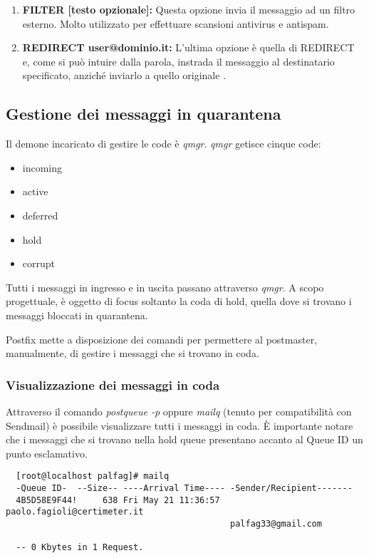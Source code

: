 \begin{table}[htp]
\begin{enumerate}[label=\textbf{\arabic*})]
      \item{\textbf{FILTER [testo opzionale]:}}
      Questa opzione invia il messaggio ad un filtro esterno. Molto utilizzato per effettuare scansioni 
      antivirus e antispam.
      
      \item{\textbf{REDIRECT user@dominio.it:}} 
      L'ultima opzione è quella di REDIRECT e, come si può intuire dalla parola, instrada il messaggio al 
      destinatario specificato, anziché inviarlo a quello originale \cite{hildebrandt2005book}.
  \end{enumerate}
  \end{table}
  
  \pagebreak
  \begin{table}[htp]
    \subsection{Gestione dei messaggi in quarantena}
    Il demone incaricato di gestire le code è \textit{qmgr}. \textit{qmgr} getisce cinque code:
    \begin{itemize}
      \item incoming
      \item active
      \item deferred
      \item hold
      \item corrupt
    \end{itemize}
  \end{table}
  
  Tutti i messaggi in ingresso e in uscita passano attraverso \textit{qmgr}. 
  A scopo progettuale, è oggetto di focus soltanto la coda di hold, 
  quella dove si trovano i messaggi bloccati in quarantena.
  
  Postfix mette a disposizione dei comandi per permettere al postmaster, manualmente, di gestire i messaggi che si 
  trovano in coda.
  
  \subsubsection{Visualizzazione dei messaggi in coda}
  Attraverso il comando \textit{postqueue -p} oppure \textit{mailq} (tenuto per compatibilità con Sendmail) è possibile visualizzare tutti
  i messaggi in coda. È importante notare che i messaggi che si trovano nella hold queue presentano accanto al Queue ID 
  un punto esclamativo.
  
  \begin{verbatim}
  [root@localhost palfag]# mailq
  -Queue ID-  --Size-- ----Arrival Time---- -Sender/Recipient-------
  4B5D58E9F44!     638 Fri May 21 11:36:57  paolo.fagioli@certimeter.it
                                            palfag33@gmail.com
  
  -- 0 Kbytes in 1 Request.
  \end{verbatim}
  
